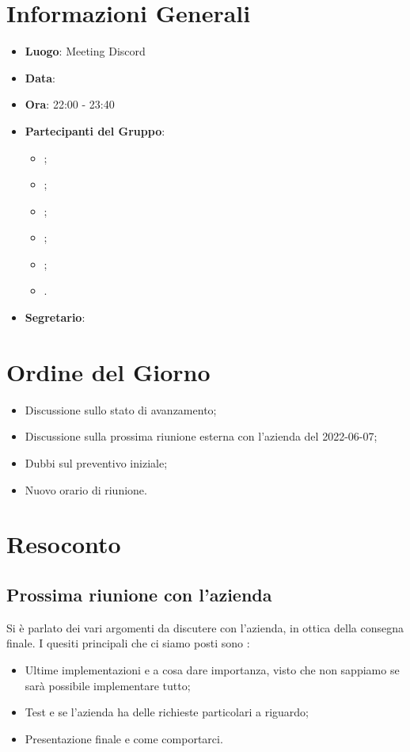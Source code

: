 \section{Informazioni Generali}

\begin{itemize}
	\item{\textbf{Luogo}}: Meeting Discord
	\item{\textbf{Data}}: \D
	\item{\textbf{Ora}}: 22:00 - 23:40
	\item{\textbf{Partecipanti del Gruppo}}:
	\begin{itemize}
		\item{\FP{};}
		\item{\GC{};}
		\item{\LW{};}
  		\item {\MB{};}
		\item{\MG{};}
		\item{\PV{}.}
	\end{itemize}
	\item{\textbf{Segretario}}: \PV{}
\end{itemize}

\section{Ordine del Giorno}
\begin{itemize}
	\item{Discussione sullo stato di avanzamento;}
	\item{Discussione sulla prossima riunione esterna con l'azienda del 2022-06-07;}
 	\item{Dubbi sul preventivo iniziale;} 
	\item {Nuovo orario di riunione.}
\end{itemize}

\section{Resoconto}
 

\subsection{Prossima riunione con l'azienda}
Si è parlato dei vari argomenti da discutere con l'azienda, in ottica della consegna finale. I quesiti principali che ci siamo posti sono : 
\begin{itemize}
	\item Ultime implementazioni e a cosa dare importanza, visto che non sappiamo se sarà possibile implementare tutto;
 	\item Test e se l'azienda ha delle richieste particolari a riguardo;
  	\item Presentazione finale e come comportarci.
\end{itemize}

